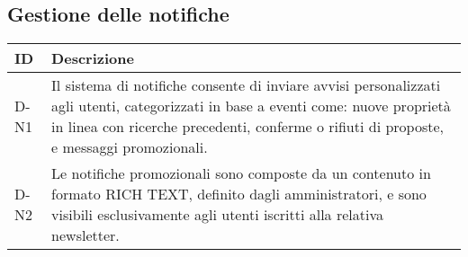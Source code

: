 \subsection*{Gestione delle notifiche}

\begin{table}[H]
    \centering
    \renewcommand{\arraystretch}{1.3} %
    
    \begin{tabular}{|p{3cm}|p{10cm}|} 
        \hline
        \textbf{ID} & \textbf{Descrizione} \\  
        \hline
        D-N1 & Il sistema di notifiche consente di inviare avvisi personalizzati agli utenti, categorizzati in base a eventi come: nuove proprietà in linea con ricerche precedenti, conferme o rifiuti di proposte, e messaggi promozionali. \\ 
        \hline
        D-N2 & Le notifiche promozionali sono composte da un contenuto in formato RICH TEXT, definito dagli amministratori, e sono visibili esclusivamente agli utenti iscritti alla relativa newsletter. \\ 
        \hline
    \end{tabular}
    
\end{table}